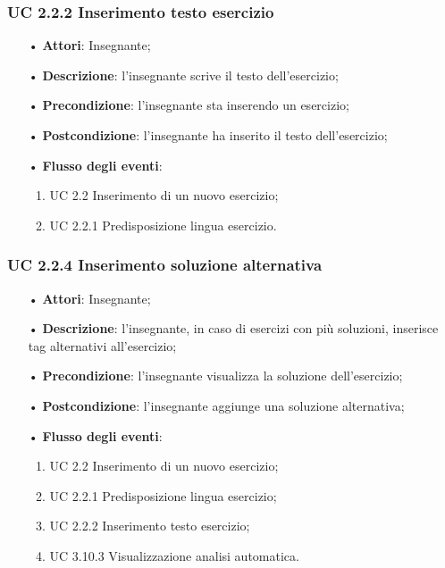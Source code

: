 \subsubsection{UC 2.2.2 Inserimento testo esercizio}
\begin{itemize}
	\item[•] \textbf{Attori}: Insegnante;
	\item[•] \textbf{Descrizione}: l'insegnante scrive il testo dell’esercizio;
	\item[•] \textbf{Precondizione}: l'insegnante sta inserendo un esercizio;
	\item[•] \textbf{Postcondizione}: l'insegnante ha inserito il testo dell'esercizio;
	\item[•] \textbf{Flusso degli eventi}: 
	\begin{enumerate}
		\item UC 2.2 Inserimento di un nuovo esercizio;
		\item UC 2.2.1 Predisposizione lingua esercizio.
	\end{enumerate}
\end{itemize}

\subsubsection{UC 2.2.4 Inserimento soluzione alternativa}
\begin{itemize}
	\item[•] \textbf{Attori}: Insegnante;
	\item[•] \textbf{Descrizione}: l'insegnante, in caso di esercizi con più soluzioni, inserisce tag alternativi all’esercizio;
	\item[•] \textbf{Precondizione}: l'insegnante visualizza la soluzione dell'esercizio;
	\item[•] \textbf{Postcondizione}: l'insegnante aggiunge una soluzione alternativa;
	\item[•] \textbf{Flusso degli eventi}:
		\begin{enumerate}
			\item UC 2.2 Inserimento di un nuovo esercizio;
			\item UC 2.2.1 Predisposizione lingua esercizio;
			\item UC 2.2.2 Inserimento testo esercizio;
			\item UC 3.10.3  Visualizzazione analisi automatica.
		\end{enumerate}
\end{itemize}


